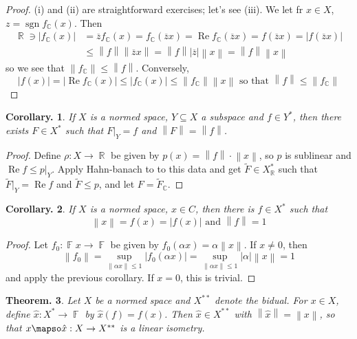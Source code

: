 \documentclass[11pt, a4paper]{memoir}
\DeclareMathOperator{\R}{{\mathbb{R}}}
\DeclareMathOperator{\C}{{\mathbb{C}}}
\DeclareMathOperator{\F}{{\mathbb{F}}}
\newcommand{\norm}[1]{\ensuremath{\left\lVert#1\right\rVert}}
\theoremstyle{change}
\newtheorem{theorem}{Theorem.}[section]
\newtheorem{corollary}[theorem]{Corollary.}
\theoremstyle{plain}
\theoremstyle{nonumberplain}
\newtheorem{proof}{Proof}
\DeclareMathOperator{\sgn}{sgn}
\renewcommand{\Re}{\ensuremath{\operatorname{Re}}}
\numberwithin{equation}{section}
\begin{document}
\begin{proof}
    (i) and (ii) are straightforward exercises; let's see (iii).
    We let fr $x\in X$, $z=\sgn f_{\C}(x)$.
    Then
    \begin{align*}
        \R\ni|f_{\C}(x)|&=\overline{z}f_{\C}(x)=f_{\C}(\overline{z}x)=\Re f_{\C}(\overline{z}x)=f(\overline{z}x)=|f(\overline{z}x)|\\
                        &\leq\norm{f}\norm{\overline{z}x}=\norm{f}|\overline{z}|\norm{x}=\norm{f}\norm{x}
    \end{align*}
    so we see that $\norm{f_{\C}}\leq\norm{f}$.
    Conversely,
    \begin{equation*}
        |f(x)|=|\Re f_{\C}(x)|\leq|f_{\C}(x)|\leq\norm{f_{\C}}\norm{x}\text{ so that }\norm{f}\leq\norm{f_{\C}}
    \end{equation*}
\end{proof}
\begin{corollary}
    If $X$ is a normed space, $Y\subseteq X$ a subspace and $f\in Y^*$, then there exists $F\in X^*$ such that $F|_{Y}=f$ and $\norm{F}=\norm{f}$.
\end{corollary}
\begin{proof}
    Define $\rho:X\to\R$ be given by $p(x)=\norm{f}\cdot\norm{x}$, so $p$ is sublinear and $\Re f\leq p|_Y$.
    Apply Hahn-banach to to this data and get $\tilde F\in X_{\R}^*$ such that $\tilde F|_Y=\Re f$ and $\tilde F\leq p$, and let $F=\tilde F_{\C}$.
\end{proof}
\begin{corollary}
    If $X$ is a normed space, $x\in C$, then there is $f\in X^*$ such that
    \begin{equation*}
        \norm{x}=f(x)=|f(x)|\text{ and }\norm{f}=1
    \end{equation*}
\end{corollary}
\begin{proof}
    Let $f_0:\F x\to\F$ be given by $f_0(\alpha x)=\alpha\norm{x}$.
    If $x\neq 0$, then
    \begin{equation*}
        \norm{f_0}=\sup_{\norm{\alpha x}\leq 1}|f_0(\alpha x)|=\sup_{\norm{\alpha x}\leq 1}|\alpha|\norm{x}=1
    \end{equation*}
    and apply the previous corollary.
    If $x=0$, this is trivial.
\end{proof}
\begin{theorem}
    Let $X$ be a normed space and $X^{**}$ denote the bidual.
    For $x\in X$, define $\hat x:X^*\to\F$ by $\hat x(f)=f(x)$.
    Then $\hat x\in X^{**}$ with $\norm{\hat x}=\norm{x}$, so that $x\mapso\hat x:X\to X^{**}$ is a linear isometry.
\end{theorem}
\end{document}
